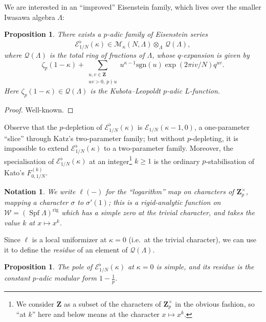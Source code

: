 \documentclass[a4paper,10pt]{amsart}
\theoremstyle{plain}
\newtheorem{proposition}[theorem]{Proposition}
\newtheorem{notation}[theorem]{Notation}
\theoremstyle{remark}
\newcommand{\ZZ}{\mathbf{Z}}
\newcommand{\Zp}{\ZZ_p}
\newcommand{\cE}{\mathcal{E}}
\newcommand{\cM}{\mathcal{M}}
\newcommand{\sgn}{\mathrm{sgn}}
\numberwithin{equation}{section}
\renewcommand{\ge}{\geqslant}
\begin{document}
  We are interested in an ``improved'' Eisenstein family, which lives over the smaller Iwasawa algebra $\Lambda$:

  \begin{proposition}
   There exists a $p$-adic family of Eisenstein series
   \[ \cE^{\flat}_{1/N}(\kappa) \in \cM_{\kappa}(N, \Lambda) \otimes_{\Lambda} \, \mathcal{Q}(\Lambda),
   \]
   where $\mathcal{Q}(\Lambda)$ is the total ring of fractions of $\Lambda$, whose $q$-expansion is given by
   \[ \zeta_p(1 - \kappa) + \sum_{\substack{u, v \in \ZZ \\ uv > 0,\ p \nmid u}} u^{\kappa - 1} \sgn(u) \exp(2\pi i v / N) q^{uv}.\]
   Here $\zeta_p(1 - \kappa) \in\mathcal{Q}(\Lambda)$ is the Kubota--Leopoldt $p$-adic $L$-function.
  \end{proposition}

  \begin{proof}
   Well-known.
  \end{proof}

  Observe that the $p$-depletion of $\cE^{\flat}_{1/N}(\kappa)$ is $\cE_{1/N}(\kappa - 1, 0)$, a one-parameter ``slice'' through Katz's two-parameter family; but without $p$-depleting, it is impossible to extend $\cE^{\flat}_{1/N}(\kappa)$ to a two-parameter family. Moreover, the specialisation of $\cE^{\flat}_{1/N}(\kappa)$ at an integer\footnote{We consider $\ZZ$ as a subset of the characters of $\Zp^\times$ in the obvious fashion, so ``at $k$'' here and below  means at the character $x \mapsto x^k$.}  $k \ge 1$ is the ordinary $p$-stabilisation of Kato's $F^{(k)}_{0, 1/N}$.
  
  
  \begin{notation}
   We write $\ell(-)$ for the ``logarithm'' map on characters of $\Zp^\times$, mapping a character $\sigma$ to $\sigma'(1)$; this is a rigid-analytic function on $\mathcal{W} = \left(\operatorname{Spf} \Lambda\right)^{\mathrm{rig}}$ which has a simple zero at the trivial character, and takes the value $k$ at $x \mapsto x^k$.
  \end{notation}
  
  Since $\ell$ is a local uniformizer at $\kappa = 0$ (i.e.~at the trivial character), we can use it to define the \emph{residue} of an element of $\mathcal{Q}(\Lambda)$.

  \begin{proposition}
   The pole of $\cE^{\flat}_{1/N}(\kappa)$ at $\kappa = 0$ is simple, and its residue is the constant $p$-adic modular form $1 - \tfrac{1}{p}$.
  \end{proposition}
\end{document}
